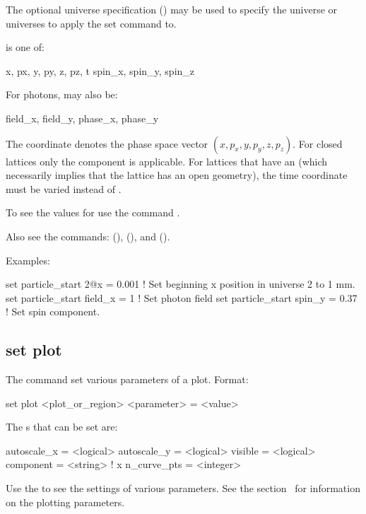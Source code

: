 {{The optional  universe specification () may be used to specify the universe
or universes to apply the set command to.

 is one of:
\begin{example}
  x, px, y, py, z, pz, t
  spin_x, spin_y, spin_z
\end{example}
For photons,  may also be:
\begin{example}
  field_x, field_y, phase_x, phase_y
\end{example}
The \vn{*} coordinate denotes the phase space vector $(x, p_x, y, p_y, z, p_z)$.  For closed
lattices only the  component is applicable. For lattices that have an  (which
necessarily implies that the lattice has an open geometry), the time  coordinate must be
varied instead of .

To see the values for  use the command .

Also see the commands:  (),  (), 
and  ().

Examples:
\begin{example}
  set particle_start 2@x = 0.001         ! Set beginning x position in universe 2 to 1 mm.
  set particle_start field_x = 1         ! Set photon field
  set particle_start spin_y = 0.37       ! Set spin component.
\end{example}


\subsection{set plot}
\label{s:set.plot}

The  command set various parameters of a plot. Format:
\begin{example}
  set plot <plot_or_region> <parameter> = <value>
\end{example}

The s that can be set are:
\begin{example}
  autoscale_x        = <logical>
  autoscale_y        = <logical>
  visible            = <logical>
  component          = <string>    ! 
  x%
  n_curve_pts        = <integer>
\end{example}
Use the  to see the settings of various parameters. See the
section~ for information on the plotting parameters.

}}
